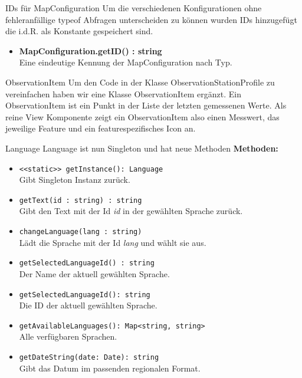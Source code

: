 \begin{Change}{IDs für MapConfiguration}
    Um die verschiedenen Konfigurationen ohne fehleranfällige typeof Abfragen unterscheiden
    zu können wurden IDs hinzugefügt die i.d.R. als Konstante gespeichert sind.
    \begin{itemize}
        \item \textbf{MapConfiguration.getID() : string}
        \\ Eine eindeutige Kennung der MapConfiguration nach Typ.
    \end{itemize}
\end{Change}

\begin{Change}{ObservationItem}
    Um den Code in der Klasse ObservationStationProfile zu vereinfachen haben wir eine Klasse ObservationItem ergänzt. Ein ObservationItem ist ein Punkt in der Liste der letzten gemessenen Werte. Als reine View Komponente zeigt ein ObservationItem also einen Messwert, das jeweilige Feature und ein featurespezifisches Icon an.
\end{Change}

\begin{Change}{Language}
    Language ist nun Singleton und hat neue Methoden
    \textbf{Methoden:}
    \begin{itemize}
        \item \texttt{<<static>> getInstance(): Language}
        \\Gibt Singleton Instanz zurück.
        \item \texttt{getText(id : string) : string}
        \\ Gibt den Text mit der Id \emph{id} in der gewählten Sprache zurück.
        \item \texttt{changeLanguage(lang : string)}
        \\ Lädt die Sprache mit der Id \emph{lang} und wählt sie aus.
        \item \texttt{getSelectedLanguageId() : string}
        \\ Der Name der aktuell gewählten Sprache.
        \item \texttt{getSelectedLanguageId(): string}
        \\ Die ID der aktuell gewählten Sprache.
        \item \texttt{getAvailableLanguages(): Map<string, string>}
        \\ Alle verfügbaren Sprachen.
        \item \texttt{getDateString(date: Date): string}
        \\ Gibt das Datum im passenden regionalen Format.
    \end{itemize}

\end{Change}